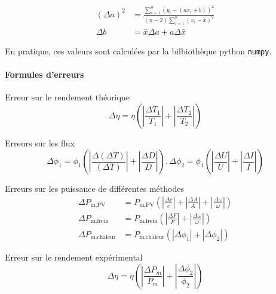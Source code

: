 \begin{equation}
    \label{eq:erreur:fit}
    \begin{aligned}
        (\Delta a)^2 &= \frac{\sum_{i=1}^{n}(y_i - (a x_i + b))^2}{(n-2) \sum_{i=1}^{n}(x_i - \bar{x})^2}\\
        \Delta b &= \bar{x} \Delta a + a \Delta \bar{x}
    \end{aligned}
\end{equation}

En pratique, ces valeurs sont calculées par la bilbiothèque python \texttt{numpy}.

\paragraph*{Formules d'erreurs}

Erreur sur le rendement théorique
\begin{equation}
    \Delta \eta = \eta \left( \left|\frac{\Delta T_1}{T_1}\right| + \left|\frac{\Delta T_2}{T_2}\right| \right)
\end{equation}

Erreurs sur les flux
\begin{equation}
    \Delta \phi_1 = \phi_1 \left( \left|\frac{\Delta (\Delta T)}{(\Delta T)}\right| + \left|\frac{\Delta D}{D}\right| \right), 
    \Delta \phi_2 = \phi_1 \left( \left|\frac{\Delta U}{U}\right| + \left|\frac{\Delta I}{I}\right| \right)
\end{equation}

Erreurs sur les puissance de différentes méthodes
\begin{align}
    \Delta P_\textrm{m,PV} &= P_\textrm{m,PV} \left( \left|\frac{\Delta c}{c}\right| + \left|\frac{\Delta A}{A}\right| + \left|\frac{\Delta \omega}{\omega}\right| \right)\\
    \Delta P_\textrm{m,frein} &= P_\textrm{m,frein} \left( \left|\frac{\Delta F}{F}\right| + \left|\frac{\Delta \omega}{\omega}\right| \right)\\
    \Delta P_\textrm{m,chaleur} &= P_\textrm{m,chaleur} (|\Delta \phi_1| + |\Delta \phi_2|)
\end{align}

Erreur sur le rendement expérimental 
\begin{equation}
    \Delta \eta = \eta \left( \left|\frac{\Delta P_m}{P_m}\right| + \left|\frac{\Delta \phi_2}{\phi_2}\right| \right)
\end{equation}

